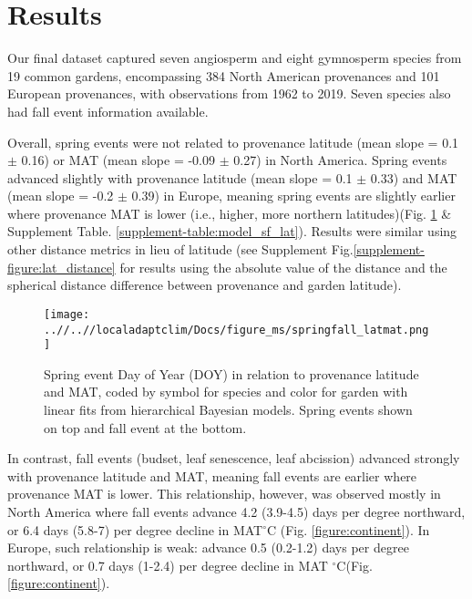 \documentclass{article}
\begin{document}
\section{Results}
Our final dataset captured seven angiosperm and eight gymnosperm species from 19 common gardens, encompassing 384 North American provenances and 101 European provenances, with observations from 1962 to 2019. Seven species also had fall event information available. 
\\



Overall, spring events were not related to provenance latitude (mean slope = 0.1 $\pm$
0.16) or MAT (mean slope = -0.09 $\pm$
  0.27) in North America.   Spring events advanced slightly with provenance latitude (mean slope = 0.1 $\pm$
  0.33) and MAT (mean slope = -0.2 $\pm$
  0.39) in Europe, meaning spring events are slightly earlier where provenance MAT is lower (i.e., higher, more northern latitudes)(Fig. \ref{figure:springfall_latmat} \& Supplement Table. \ref{supplement-table:model_sf_lat}). Results were similar using other distance metrics in lieu of latitude (see Supplement Fig.\ref{supplement-figure:lat_distance} for results using the absolute value of the distance and the spherical distance difference between provenance and garden latitude). 

\begin{figure}[!h] 
    \centering
 \texttt{[image: ..//..//localadaptclim/Docs/figure\_ms/springfall\_latmat.png]}
    \caption{Spring event Day of Year (DOY) in relation to provenance latitude and MAT, coded by symbol for species and color for garden with linear fits from hierarchical Bayesian models. Spring events shown on top and fall event at the bottom.} 
    \label{figure:springfall_latmat}
\end{figure}


In contrast, fall events (budset, leaf senescence, leaf abcission) advanced strongly with provenance latitude and MAT, meaning fall events are earlier where provenance MAT is lower. This relationship, however, was observed mostly in North America where fall events advance 4.2 (3.9-4.5) days per degree northward, or 6.4 days (5.8-7) per degree decline in MAT$^{\circ}$C (Fig. \ref{figure:continent}). In Europe, such relationship is weak: advance 0.5 (0.2-1.2) days per degree northward, or 0.7 days (1-2.4) per degree decline in MAT $^{\circ}$C(Fig. \ref{figure:continent}). 
\end{document}
